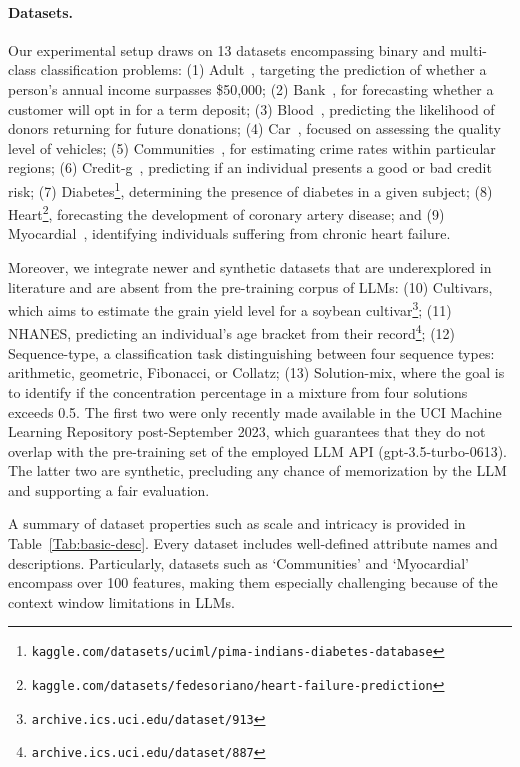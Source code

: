 \paragraph{Datasets.}
Our experimental setup draws on 13 datasets encompassing binary and multi-class classification problems: (1) Adult~\cite{asuncion2007uci}, targeting the prediction of whether a person’s annual income surpasses \$50,000; (2) Bank~\cite{moro2014data}, for forecasting whether a customer will opt in for a term deposit; (3) Blood~\cite{yeh2009knowledge}, predicting the likelihood of donors returning for future donations; (4) Car~\cite{kadra2021well}, focused on assessing the quality level of vehicles; (5) Communities~\cite{misc_communities_and_crime_183}, for estimating crime rates within particular regions; (6) Credit-g~\cite{kadra2021well}, predicting if an individual presents a good or bad credit risk; (7) Diabetes\footnote{\texttt{kaggle.com/datasets/uciml/pima-indians-diabetes-database}}, determining the presence of diabetes in a given subject; (8) Heart\footnote{\texttt{kaggle.com/datasets/fedesoriano/heart-failure-prediction}}, forecasting the development of coronary artery disease; and (9) Myocardial~\cite{misc_myocardial_infarction_complications_579}, identifying individuals suffering from chronic heart failure.

Moreover, we integrate newer and synthetic datasets that are underexplored in literature and are absent from the pre-training corpus of LLMs: (10) Cultivars, which aims to estimate the grain yield level for a soybean cultivar\footnote{\texttt{archive.ics.uci.edu/dataset/913}}; (11) NHANES, predicting an individual’s age bracket from their record\footnote{\texttt{archive.ics.uci.edu/dataset/887}}; (12) Sequence-type, a classification task distinguishing between four sequence types: arithmetic, geometric, Fibonacci, or Collatz; (13) Solution-mix, where the goal is to identify if the concentration percentage in a mixture from four solutions exceeds 0.5. The first two were only recently made available in the UCI Machine Learning Repository post-September 2023, which guarantees that they do not overlap with the pre-training set of the employed LLM API (gpt-3.5-turbo-0613). The latter two are synthetic, precluding any chance of memorization by the LLM and supporting a fair evaluation.

A summary of dataset properties such as scale and intricacy is provided in Table~\ref{Tab:basic-desc}.
Every dataset includes well-defined attribute names and descriptions. Particularly, datasets such as `Communities' and `Myocardial' encompass over 100 features, making them especially challenging because of the context window limitations in LLMs.

